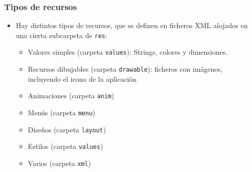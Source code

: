 \documentclass[hyperref={pdfpagelabels=true},ucs]{beamer}
\begin{document}
\begin{frame}[fragile]
\frametitle{Tipos de recursos}


\begin{itemize}
\item Hay distintos \alert{tipos de recursos}, que se definen en ficheros XML
  alojados en una cierta subcarpeta de \verb|res|:
  \begin{itemize}
  \item Valores simples (carpeta \verb|values|): Strings, colores y
    dimensiones.
  \item Recursos dibujables (carpeta \verb|drawable|): ficheros con
    imágenes, incluyendo el icono de la aplicación
  \item Animaciones (carpeta \verb|anim|)
  \item Menús (carpeta \verb|menu|)
  \item Diseños (carpeta \verb|layout|)
  \item Estilos (carpeta \verb|values|)
  \item Varios (carpeta \verb|xml|)
  \end{itemize}
\end{itemize}
\end{frame}
\end{document}
